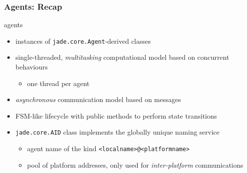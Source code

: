 \documentclass{beamer}\mode<presentation>{\usetheme{AMSCesenaPurpleAndGold}}
\begin{document}
\begin{frame}\frametitle{\jade{} Agents: Recap}
    \begin{block}{\jade{} agents}
        \begin{itemize}
            \item instances of \alert{\texttt{jade.core.Agent}}-derived classes
            \item \alert{single-threaded}, \emph{multitasking} computational model based on concurrent behaviours
            \begin{itemize}
            	\item one thread per agent
            \end{itemize}
            \item \emph{asynchronous} communication model based on \fipa{} \acl{} messages
            \item FSM-like lifecycle with public methods to perform state transitions
            \item \alert{\texttt{jade.core.AID}} class implements the globally unique naming service
            \begin{itemize}
                \item agent name of the kind \texttt{<localname>@<platformname>}
                \item pool of platform addresses, only used for \emph{inter-platform} communications
            \end{itemize}
        \end{itemize}
    \end{block}
\end{frame}
\end{document}
